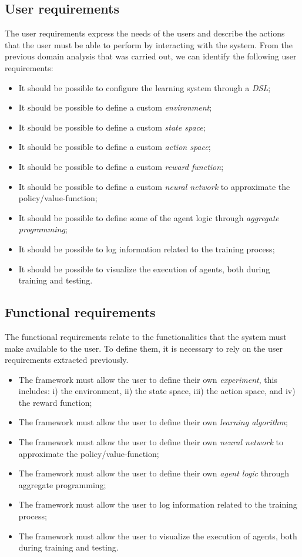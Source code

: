 \documentclass[12pt,a4paper,openright,twoside]{book}
\begin{document}
\subsection*{User requirements}
The user requirements express the needs of the users and describe the actions that the user must be able to perform by interacting with the system.
    From the previous domain analysis that was carried out, we can identify the following user requirements:
\begin{itemize}
    \item It should be possible to configure the learning system through a \emph{DSL};
    \item It should be possible to define a custom \emph{environment};
    \item It should be possible to define a custom \emph{state space};
    \item It should be possible to define a custom \emph{action space};
    \item It should be possible to define a custom \emph{reward function};
    \item It should be possible to define a custom \emph{neural network} to approximate the policy/value-function;
    \item It should be possible to define some of the agent logic through \emph{aggregate programming};
    \item It should be possible to log information related to the training process;
    \item It should be possible to visualize the execution of agents, both during training and testing.
\end{itemize}

\subsection*{Functional requirements}
The functional requirements relate to the functionalities that the system must make available to the user. 
    To define them, it is necessary to rely on the user requirements extracted previously.
\begin{itemize}
    \item The framework must allow the user to define their own \emph{experiment}, this includes: 
            i) the environment, 
            ii) the state space, 
            iii) the action space, and
            iv) the reward function;
    \item The framework must allow the user to define their own \emph{learning algorithm};
    \item The framework must allow the user to define their own \emph{neural network} to approximate the policy/value-function;
    \item The framework must allow the user to define their own \emph{agent logic} through aggregate programming;
    \item The framework must allow the user to log information related to the training process;
    \item The framework must allow the user to visualize the execution of agents, both during training and testing.
\end{itemize}
\end{document}
